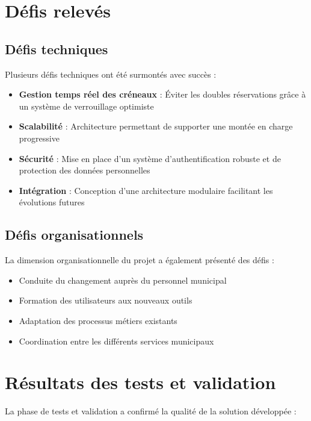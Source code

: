 \section*{Défis relevés}

\subsection*{Défis techniques}

Plusieurs défis techniques ont été surmontés avec succès :

\begin{itemize}
    \item \textbf{Gestion temps réel des créneaux} : Éviter les doubles réservations grâce à un système de verrouillage optimiste
    \item \textbf{Scalabilité} : Architecture permettant de supporter une montée en charge progressive
    \item \textbf{Sécurité} : Mise en place d'un système d'authentification robuste et de protection des données personnelles
    \item \textbf{Intégration} : Conception d'une architecture modulaire facilitant les évolutions futures
\end{itemize}

\subsection*{Défis organisationnels}

La dimension organisationnelle du projet a également présenté des défis :

\begin{itemize}
    \item Conduite du changement auprès du personnel municipal
    \item Formation des utilisateurs aux nouveaux outils
    \item Adaptation des processus métiers existants
    \item Coordination entre les différents services municipaux
\end{itemize}

\section*{Résultats des tests et validation}

La phase de tests et validation a confirmé la qualité de la solution développée :

